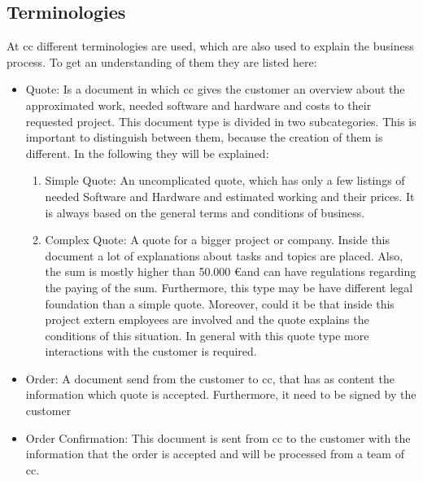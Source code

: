\subsection{Terminologies}
At \gls{cc} different terminologies are used, which are also used to explain the business process. To get an understanding of them they are listed here:
\begin{itemize}
	\item Quote: \newline
	Is a document in which \gls{cc} gives the customer an overview about the approximated work, needed software and hardware and costs to their requested project. This document type is divided in two subcategories. This is important to distinguish between them, because the creation of them is different. In the following they will be explained:
	\begin{enumerate}
		\item Simple Quote: \newline
		An uncomplicated quote, which has only a few listings of needed Software and Hardware and estimated working and their prices. It is always based on the general terms and conditions of business.
		\item Complex Quote: \newline
		A quote for a bigger project or company. Inside this document a lot of explanations about tasks and topics are placed. Also, the sum is mostly higher than 50.000 \euro and can have regulations regarding the paying of the sum. Furthermore, this type may be have different legal foundation than a simple quote. Moreover, could it be that inside this project extern employees are involved and the quote explains the conditions of this situation. In general with this quote type more interactions with the customer is required. 
	\end{enumerate}
	\item Order: \newline
	A document send from the customer to \gls{cc}, that has as content the information which quote is accepted. Furthermore, it need to be signed by the customer
	\item Order Confirmation: \newline
	This document is sent from \gls{cc} to the customer with the information that the order is accepted and will be processed from a team of \gls{cc}.
\end{itemize}

